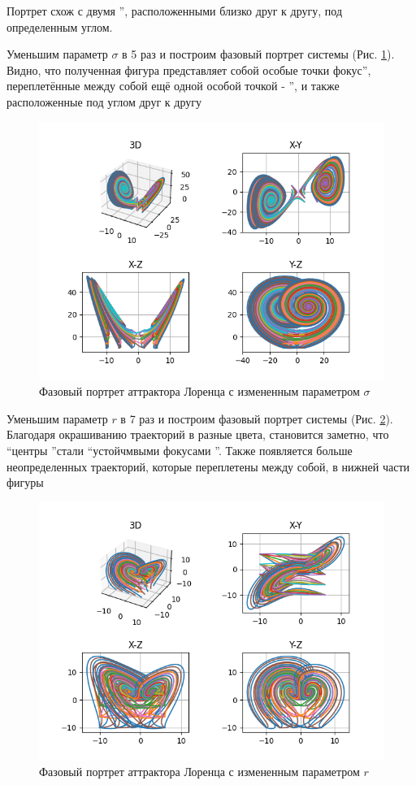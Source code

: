 Портрет схож с двумя \textquotedblright, расположенными близко друг к другу, под определенным углом.

Уменьшим параметр $\sigma$ в 5 раз и построим фазовый портрет системы (Рис. \ref{fig:21}).
Видно, что полученная фигура представляет собой особые точки  фокус\textquotedblright, переплетённые
между собой ещё одной особой точкой - \textquotedblright, и также расположенные под углом друг к другу

\begin{figure}[H]
	\centering
	\includegraphics[width=0.7\linewidth]{body/images/Lorenz-attractor-type-2.png}
	\caption{Фазовый портрет аттрактора Лоренца с измененным параметром $\sigma$}
	\label{fig:21}
\end{figure}

Уменьшим параметр $r$ в 7 раз и построим фазовый портрет системы (Рис. \ref{fig:22}).
Благодаря окрашиванию траекторий в разные цвета, становится заметно, что \textquotedblleft центры \textquotedblright стали \textquotedblleft устойчмвыми фокусами \textquotedblright.
Также появляется больше неопределенных траекторий, которые переплетены между собой, в нижней части фигуры

\begin{figure}[H]
	\centering
	\includegraphics[width=0.6\linewidth]{body/images/Lorenz-attractor-type-3.png}
	\caption{Фазовый портрет аттрактора Лоренца с измененным параметром $r$}
	\label{fig:22}
\end{figure}

